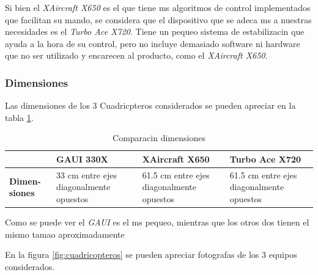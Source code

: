 \documentclass[spanish,12pt,a4paper,titlepage]{report}
\begin{document}
	Si bien el \emph{XAircraft X650} es el que tiene ms algoritmos de control implementados que facilitan su mando, se considera que el dispositivo que se adeca ms a nuestras necesidades es el \emph{Turbo Ace X720}. Tiene un pequeo sistema de estabilizacin que ayuda a la hora de su control, pero no incluye demasiado software ni hardware que no ser utilizado y encarecen al producto, como el \emph{XAircraft X650}.

\subsubsection*{Dimensiones}

	Las dimensiones de los 3 Cuadricpteros considerados se pueden apreciar en la tabla \ref{tab:dimensiones}.

\begin{table}[H]
\begin{tabular}{p{40pt}|p{80pt}|p{130pt}|p{130pt}|} 
\cline{2-4}
& \cellcolor[gray]{0.8} \textbf{GAUI 330X} 
& \cellcolor[gray]{0.8} \textbf{XAircraft X650} 
& \cellcolor[gray]{0.8} \textbf{Turbo Ace X720} \\ \cline{2-4} \hline
\multicolumn{1}{|p{40pt}|}{\cellcolor[gray]{0.8}\textbf{Dimen- siones}} 
& 33 cm entre ejes diagonalmente opuestos & 61.5 cm entre ejes diagonalmente opuestos & 61.5 cm entre ejes diagonalmente opuestos \\ 
\hline 
\end{tabular}
\caption{Comparacin dimensiones}
\label{tab:dimensiones}
\end{table}

	Como se puede ver el \emph{GAUI} es el ms pequeo, mientras que los otros dos tienen el mismo tamao aproximadamente

	En la figura \ref{fig:cuadricopteros} se pueden apreciar fotografas de los 3 equipos considerados.
\end{document}
